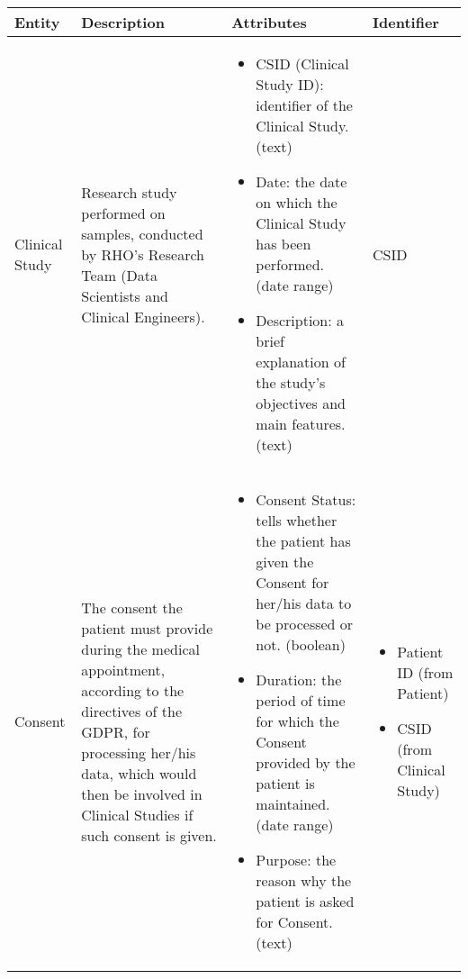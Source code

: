 \begin{longtable}{|p{}|p{} |p{}|p{} |} 
\hline
\textbf{Entity} & \textbf{Description} & \textbf{Attributes} & \textbf{Identifier}  \\\hline


Clinical Study & Research study performed on samples, conducted by RHO’s Research Team (Data Scientists and Clinical Engineers). & \begin{itemize}
        \vspace{-1em}
        \item CSID (Clinical Study ID): identifier of the Clinical Study. (text)
        \item Date: the date on which the Clinical Study has been performed. (date range)
        \item Description: a brief explanation of the study's objectives and main features. (text)
        \end{itemize}
 &  CSID\\\hline
 
Consent & The consent the patient must provide during the medical appointment, according to the directives of the GDPR, for processing her/his data, which would then be involved in Clinical Studies if such consent is given. & \begin{itemize}
        \vspace{-1em}
        \item Consent Status: tells whether the patient has given the Consent for her/his data to be processed or not. (boolean)
        \item Duration: the period of time for which the Consent provided by the patient is maintained. (date range)
        \item Purpose: the reason why the patient is asked for Consent. (text)        
    \end{itemize}
 &  \begin{itemize}
    \vspace{-1em}
    \item Patient ID (from Patient)
    \item CSID (from Clinical Study)
 \end{itemize}
    \\\hline


\end{longtable}
